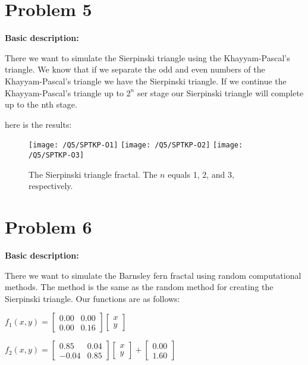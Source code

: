 \documentclass{article}
\begin{document}
    \section*{Problem 5}
    \textbf{Basic description:}

    There we want to simulate the Sierpinski triangle using the Khayyam-Pascal's triangle.
    We know that if we separate the odd and even numbers of the Khayyam-Pascal's triangle we have the Sierpinski triangle.
    If we continue the Khayyam-Pascal's triangle up to $2^n$ ser stage our Sierpinski triangle will complete up to the nth stage.
    
    here is the results:

    \begin{figure}[!htb]
        \centering
        \texttt{[image: /Q5/SPTKP-O1]}
        \label{fig:5.1.1}
        \texttt{[image: /Q5/SPTKP-O2]}
        \label{fig:5.1.2}
        \texttt{[image: /Q5/SPTKP-O3]}
        \label{fig:5.1.3}
        \caption{The Sierpinski triangle fractal. The $n$ equals 1, 2, and 3, respectively.}
    \end{figure}
    \section*{Problem 6}
    \textbf{Basic description:}

    There we want to simulate the Barnsley fern fractal using random computational methods.
    The method is the same as the random method for creating the Sierpinski triangle.
    Our functions are as follows:

    $f_{1}(x, y)=\left[\begin{array}{cc}0.00 & 0.00 \\ 0.00 & 0.16\end{array}\right]\left[\begin{array}{l}x \\ y\end{array}\right]$
    
    $f_{2}(x, y)=\left[\begin{array}{cc}0.85 & 0.04 \\ -0.04 & 0.85\end{array}\right]\left[\begin{array}{l}x \\ y\end{array}\right]+\left[\begin{array}{l}0.00 \\ 1.60\end{array}\right]$
    
\end{document}
